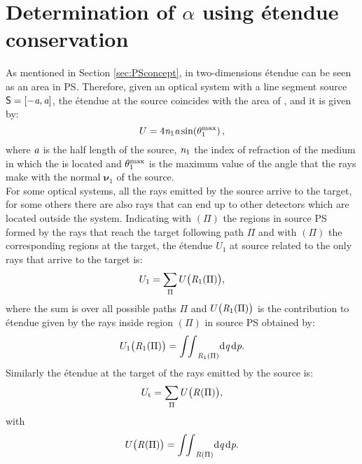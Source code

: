 \section{Determination of $\alpha$ using \'{e}tendue conservation} \label{sec:Tir_alpha}
As mentioned in Section \ref{sec:PSconcept}, in two-dimensions \'{e}tendue can be seen as an area in PS. 
Therefore, given an optical system with a line segment source $\textsf{S} = [-\textit{a}, \textit{a}]$, the \'{e}tendue at the source coincides with the area of , and it is given by:
\begin{equation}\label{eq:etenduesource}
U = 4\textit{n}_1 \textit{a} \sin(\theta_1^{\textrm{max}})\,,
\end{equation}
 where $\textit{a}$ is the half length of the source, $\textit{n}_1$ the index of refraction of the medium in which the  is located and $\theta_1^{\textrm{max}}$ is the maximum value of the angle that the rays make with the normal $\boldsymbol{\nu}_1$ of the source.\\ \indent 
For some optical systems, all the rays emitted by the source arrive to the target, for some others there are also rays that can end up to other detectors which are located outside the system. 
Indicating with $(\Pi)$ the regions in source PS formed by the rays that reach the target following path $\Pi$ and with $(\Pi)$ the corresponding regions at the target, the \'{e}tendue $U_1$ at source related to the only rays that arrive to the target is:
\begin{equation}\label{eq:etenduesumsource}
U_1 = \sum_\Pi{U\big(\mbox{$\emph{R}_{\textit{$1$}}$}(\Pi)\big)},
\end{equation}
where the sum is over all possible paths $\Pi$ and $U\big(\mbox{$\emph{R}_{\textit{$1$}}$}(\Pi)\big)$ is the contribution to \'{e}tendue given by the rays inside region 
$(\Pi)$ in source PS obtained by:
\begin{equation}\label{eq:etendueintegralsource}
U_1\big(\mbox{$\emph{R}_{\textit{$1$}}$}(\Pi)\big) = {\int\!\!\int}_{\emph{R}_1(\Pi)} \textrm{d}\textit{q}\,\textrm{d}\textit{p}.
\end{equation}
Similarly the \'{e}tendue at the target of the rays emitted by the source is:
\begin{equation}
U_\textrm{t}= \sum_\Pi{U\big(\mbox{$\emph{R}_{\textit{}}$}(\Pi)\big)},
\end{equation}
with
\begin{equation}\label{eq:etendueintegraltarget}
U\big(\mbox{$\emph{R}_{\textit{}}$}(\Pi)\big) = {\int\!\!\int}_{\emph{R}(\Pi)} \textrm{d}\textit{q}\,\textrm{d}\textit{p}.
\end{equation}
